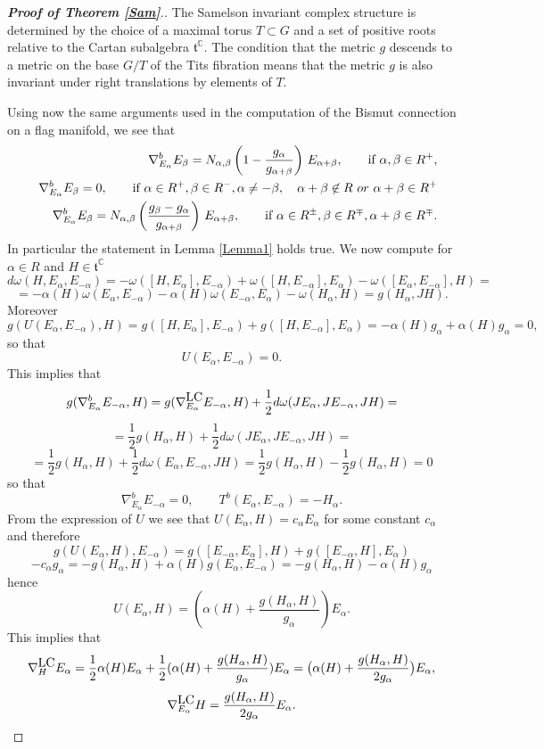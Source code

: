 \documentclass{amsart}
\numberwithin{equation}{section}
\theoremstyle{definition}
\renewcommand{\1}{\mathds{1}}
\renewcommand{\a}{\alpha}
\renewcommand{\b}{\beta}
\renewcommand{\o}{\omega}
\newcommand{\gt}{\mathfrak t}
\renewcommand{\>}{\rightarrow}
\begin{document}
\begin{proof}[{\bf Proof of Theorem \ref{Sam}}.] The Samelson invariant complex structure is determined by the choice of a maximal torus $T\subset G$ and a set of positive roots relative to the Cartan subalgebra $\gt^{\mathbb C}$. The condition that the metric $g$ descends to a metric on the base $G/T$ of the Tits fibration means that the metric $g$ is also invariant under right translations by elements of $T$. \par
Using now the same arguments used in the computation of the Bismut connection on a flag manifold, we see that
\begin{eqnarray}\label{conn2}
&& \nabla^b_{E_\a}E_\b= N_{\a,\b}\left(1-\frac{g_\a}{g_{\a+\b}}\right) \, E_
{\a+\b},\qquad \mbox{if}\ \a,\b\in R^+,\\
&& \nabla^b_{E_\a}E_\b= 0, \qquad \mbox{if}\ \a\in R^+, \b\in R^-,\a\neq -\b,\quad  \a+\b\not\in R\ {\rm{or}}\ \a+\b\in R^+\\
&& \nabla^b_{E_\a}E_\b= N_{\a,\b}\left(\frac{g_\b-g_\a}{g_{\a+\b}}\right) \, E_
{\a+\b},\qquad \mbox{if}\ \a\in R^{\pm},\b\in R^{\mp}, \a+\b \in R^{\mp}.
\end{eqnarray}
In particular the statement in Lemma \ref{Lemma1} holds true.
We now compute for $\a\in R$ and $H\in \gt^{\mathbb C}$
$$d\o(H,E_\a,E_{-\a}) = -\o([H,E_\a],E_{-\a}) + \o([H,E_{-\a}],E_\a) -\o([E_\a,E_{-\a}],H) =$$
$$=  -\a(H)\o(E_\a,E_{-\a})-\a(H)\o(E_{-\a},E_\a)-\o(H_\a,H)= g(H_\a,JH).$$
Moreover
$$g(U(E_\a,E_{-\a}),H) = g([H,E_\a],E_{-\a}) + g([H,E_{-\a}],E_\a) = -\a(H)g_\a +\a(H)g_\a=0,$$
so that
$$U(E_\a,E_{-\a}) = 0.$$
This implies that
$$g(\nabla^b_{E_\a}E_{-\a},H) = g(\nabla^{\mbox{\tiny LC}}_{E_\a}E_{-\a},H) + \frac 12 d\o(JE_\a,JE_{-\a},JH) = $$
$$ =  \frac 12 g(H_\a,H) + \frac 12 d\o(JE_\a,JE_{-\a},JH) = $$
$$= \frac 12 g(H_\a,H) + \frac 12 d\o(E_\a,E_{-\a},JH) = \frac 12 g(H_\a,H) - \frac 12 g(H_\a,H) = 0$$
so that
\begin{equation}\nabla^b_{E_\a}E_{-\a} = 0,\qquad T^b(E_\a,E_{-\a}) = -H_\a.\end{equation}
From the expression of $U$ we see that $U(E_\a,H) =c_\a E_\a$ for some constant $c_\a$ and therefore
$$g(U(E_\a,H),E_{-\a}) = g([E_{-\a},E_\a],H) + g([E_{-\a},H],E_\a) $$
$$-c_\a g_\a = -g(H_\a,H) + \a(H)g(E_\a,E_{-\a}) = -g(H_\a,H) -\a(H) g_\a$$
hence
$$U(E_\a,H) =(\a(H)+\frac{g(H_\a,H)}{g_\a}) E_\a.$$
This implies that
$$\nabla^{\mbox{\tiny LC}}_HE_\a = \frac 12 \a(H)E_\a + \frac 12 (\a(H)+\frac{g(H_\a,H)}{g_\a}) E_\a = \big(\a(H) + \frac{g(H_\a,H)}{2g_\a}\big) E_\a,$$
$$\nabla^{\mbox{\tiny LC}}_{E_\a}H =  \frac{g(H_\a,H)}{2g_\a} E_\a.$$

\end{proof}
\end{document}
